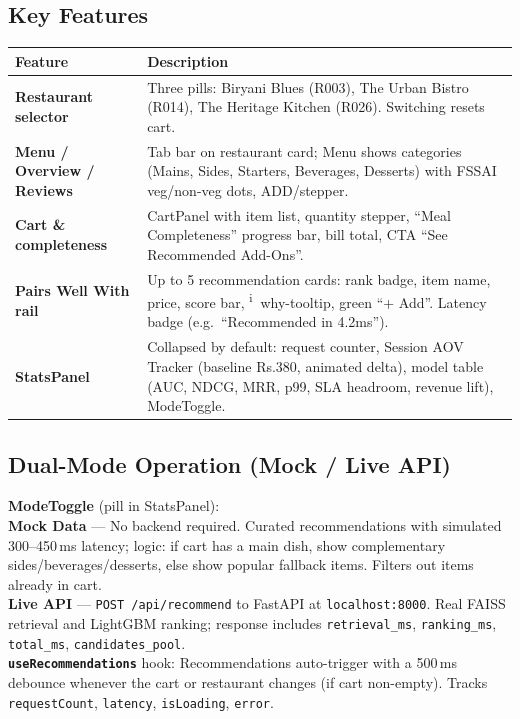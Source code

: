 \documentclass[11pt,a4paper]{article}
\begin{document}
\subsection{Key Features}

{\small
\begin{center}
\begin{tabularx}{\linewidth}{>{\bfseries\RaggedRight\arraybackslash}p{2.8cm} >{\RaggedRight\arraybackslash}X}
  \toprule
  \textbf{Feature} & \textbf{Description} \\
  \midrule
  Restaurant selector &
    Three pills: Biryani Blues (R003), The Urban Bistro (R014), The Heritage Kitchen (R026). Switching resets cart. \\[3pt]
  Menu / Overview / Reviews &
    Tab bar on restaurant card; Menu shows categories (Mains, Sides, Starters, Beverages, Desserts) with FSSAI veg/non-veg dots, ADD/stepper. \\[3pt]
  Cart \& completeness &
    CartPanel with item list, quantity stepper, ``Meal Completeness'' progress bar, bill total, CTA ``See Recommended Add-Ons''. \\[3pt]
  Pairs Well With rail &
    Up to 5 recommendation cards: rank badge, item name, price, score bar, \textsuperscript{\textcircled{\scriptsize i}} why-tooltip, green ``+ Add''. Latency badge (e.g.\ ``Recommended in 4.2ms''). \\[3pt]
  StatsPanel &
    Collapsed by default: request counter, Session AOV Tracker (baseline Rs.380, animated delta), model table (AUC, NDCG, MRR, p99, SLA headroom, revenue lift), ModeToggle. \\
  \bottomrule
\end{tabularx}
\end{center}
}

\subsection{Dual-Mode Operation (Mock / Live API)}

\begin{metricbox}
\textbf{ModeToggle} (pill in StatsPanel): \\
\textbf{Mock Data} --- No backend required. Curated recommendations with simulated 300--450\,ms latency; logic: if cart has a main dish, show complementary sides/beverages/desserts, else show popular fallback items. Filters out items already in cart. \\
\textbf{Live API} --- \texttt{POST /api/recommend} to FastAPI at \texttt{localhost:8000}. Real FAISS retrieval and LightGBM ranking; response includes \texttt{retrieval\_ms}, \texttt{ranking\_ms}, \texttt{total\_ms}, \texttt{candidates\_pool}. \\
\medskip
\textbf{\texttt{useRecommendations}} hook: Recommendations auto-trigger with a 500\,ms debounce whenever the cart or restaurant changes (if cart non-empty). Tracks \texttt{requestCount}, \texttt{latency}, \texttt{isLoading}, \texttt{error}.
\end{metricbox}
\end{document}
